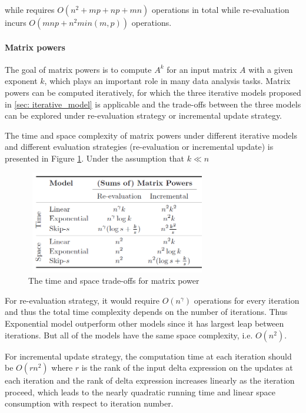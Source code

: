 while requires $O(n^2 + mp + np + mn)$ operations in total while re-evaluation incurs $O(mnp + n^2min(m,p))$ operations.

\paragraph{Matrix powers}
The goal of matrix powers is to compute $A^k$ for an input matrix $A$ with a given exponent $k$, which plays an important role in many data analysis tasks. Matrix powers can be computed iteratively, for which the three iterative models proposed in \ref{sec: iterative_model} is applicable and the trade-offs between the three models can be explored under re-evaluation strategy or incremental update strategy.

The time and space complexity of matrix powers under different iterative models and different evaluation strategies (re-evaluation or incremental update) is presented in Figure \ref{fig:time_space_complexity_matrix_power}. Under the assumption that $k \ll n$ 

\begin{figure}
    \centering
    \includegraphics[width=8cm, height=4.5cm]{Figures/time_space_complexity_matrix_powers.png}
    \caption{The time and space trade-offs for matrix power}
    \label{fig:time_space_complexity_matrix_power}
\end{figure}

For re-evaluation strategy, it would require $O(n^{\gamma})$ operations for every iteration and thus the total time complexity depends on the number of iterations. Thus Exponential model outperform other models since it has largest leap between iterations. But all of the models have the same space complexity, i.e. $O(n^2)$.

For incremental update strategy, the computation time at each iteration should be $O(rn^2)$ where $r$ is the rank of the input delta expression on the updates at each iteration and the rank of delta expression increases linearly as the iteration proceed, which leads to the nearly quadratic running time and linear space consumption with respect to iteration number.

